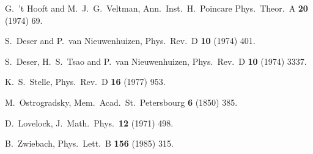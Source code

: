 \documentclass[12pt]{article}
\begin{document}
 \begin{small}
 \begin{thebibliography}{99} 

  G.~'t Hooft and M.~J.~G.~Veltman,
  Ann.\ Inst.\ H.\ Poincare Phys.\ Theor.\ A {\bf 20} (1974) 69.

  S.~Deser and P.~van Nieuwenhuizen,
  Phys.\ Rev.\ D {\bf 10} (1974) 401.
  
  S.~Deser, H.~S.~Tsao and P.~van Nieuwenhuizen,
  Phys.\ Rev.\ D {\bf 10} (1974) 3337.
  
  K.~S.~Stelle,
  Phys.\ Rev.\ D {\bf 16} (1977) 953.

  M.~Ostrogradsky,
  Mem.\ Acad.\ St.\ Petersbourg {\bf 6} (1850)   385.


  D.~Lovelock,
  J.\ Math.\ Phys.\  {\bf 12} (1971) 498.
  
  B.~Zwiebach,
  Phys.\ Lett.\ B {\bf 156} (1985) 315.



\end{thebibliography}
\end{small}
\end{document}
